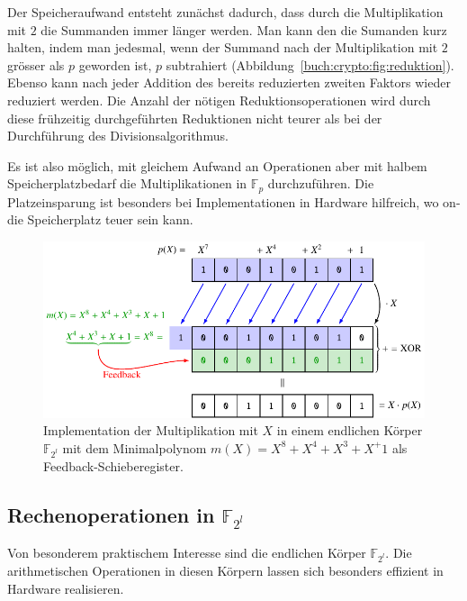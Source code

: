 Der Speicheraufwand entsteht zunächst dadurch, dass durch die Multiplikation
mit $2$ die Summanden immer länger werden.
Man kann den die Sumanden kurz halten, indem man jedesmal, wenn 
der Summand nach der Multiplikation mit $2$ grösser als $p$ geworden ist,
$p$ subtrahiert (Abbildung~\ref{buch:crypto:fig:reduktion}).
Ebenso kann nach jeder Addition des bereits reduzierten zweiten
Faktors wieder reduziert werden.
Die Anzahl der nötigen Reduktionsoperationen wird durch diese
frühzeitig durchgeführten Reduktionen nicht teurer als bei der Durchführung
des Divisionsalgorithmus.


Es ist also möglich, mit gleichem Aufwand an Operationen
aber mit halbem Speicherplatzbedarf die Multiplikationen in $\mathbb{F}_p$
durchzuführen.
Die Platzeinsparung ist besonders bei Implementationen in Hardware 
hilfreich, wo on-die Speicherplatz teuer sein kann.

\begin{figure}
\centering
\includegraphics{chapters/90-crypto/images/schieberegister.pdf}
\caption{Implementation der Multiplikation mit $X$ in einem 
endlichen Körper $\mathbb{F}_{2^l}$ mit dem Minimalpolynom
$m(X) = X^8+X^4+X^3+X^+1$ als Feedback-Schieberegister.
\label{buch:crypto:fig:schieberegister}}
\end{figure}

\subsection{Rechenoperationen in $\mathbb{F}_{2^l}$
\label{buch:subsection:rechenoperatione-in-f2l}}
Von besonderem praktischem Interesse sind die endlichen Körper
$\mathbb{F}_{2^l}$.
Die arithmetischen Operationen in diesen Körpern lassen sich besonders
effizient in Hardware realisieren.

